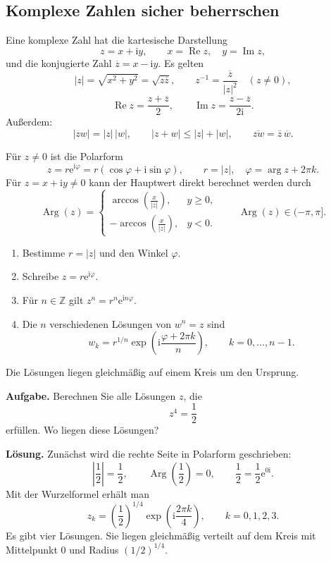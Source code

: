 \documentclass[11pt,a4paper]{article}
\newcommand{\Z}{\mathbb Z}
\newcommand{\ii}{\mathrm i}
\newcommand{\ee}{\mathrm e}
\newcommand{\Arg}{\operatorname{Arg}}
\newcommand{\Ree}{\operatorname{Re}}
\newcommand{\Imm}{\operatorname{Im}}
\newcommand{\1}{\mathbf 1}
\begin{document}
\subsection{Komplexe Zahlen sicher beherrschen}
Eine komplexe Zahl hat die kartesische Darstellung
\[
z=x+\ii y,\qquad x=\Ree z,\quad y=\Imm z,
\]
und die konjugierte Zahl $\overline z=x-\ii y$. Es gelten
\[
|z|=\sqrt{x^2+y^2}=\sqrt{z\overline z},\qquad
z^{-1}=\frac{\overline z}{|z|^2}\quad(z\neq0),
\]
\[
\Ree z=\frac{z+\overline z}{2},\qquad
\Imm z=\frac{z-\overline z}{2\ii}.
\]
Außerdem:
\[
|zw|=|z|\,|w|,\qquad |z+w|\le |z|+|w|,\qquad
\overline{zw}=\overline z\,\overline w.
\]

Für $z\neq0$ ist die Polarform
\[
z=r\ee^{\ii\varphi}=r(\cos\varphi+\ii\sin\varphi),
\qquad r=|z|,\quad \varphi=\arg z+2\pi k.
\]
Für $z=x+\ii y\neq0$ kann der Hauptwert direkt berechnet werden durch
\[
\Arg(z)=
\begin{cases}
\displaystyle \arccos\!\left(\frac{x}{|z|}\right),&y\geq0,\\[2mm]
\displaystyle-\arccos\!\left(\frac{x}{|z|}\right),&y<0.
\end{cases}
\qquad \Arg(z)\in(-\pi,\pi].
\]

\begin{kochrezeptbox}[title={Polarform, Potenzen und Wurzeln}]
\begin{enumerate}
\item Bestimme $r=|z|$ und den Winkel $\varphi$.
\item Schreibe $z=r\ee^{\ii\varphi}$.
\item Für $n\in\Z$ gilt $z^n=r^n\ee^{\ii n\varphi}$.
\item Die $n$ verschiedenen Lösungen von $w^n=z$ sind
\[
w_k=r^{1/n}\exp\!\left(\ii\frac{\varphi+2\pi k}{n}\right),
\qquad k=0,\ldots,n-1.
\]
\end{enumerate}
Die Lösungen liegen gleichmäßig auf einem Kreis um den Ursprung.
\end{kochrezeptbox}

\begin{beispielbox}[title=Vorgerechnetes Beispiel: vierte Wurzeln]
\textbf{Aufgabe.} Berechnen Sie alle Lösungen $z$, die
\[
z^4=\frac12
\]
erfüllen. Wo liegen diese Lösungen?

\textbf{Lösung.} Zunächst wird die rechte Seite in Polarform geschrieben:
\[
\left|\frac12\right|=\frac12,\qquad
\Arg\!\left(\frac12\right)=0,\qquad
\frac12=\frac12\ee^{0\ii}.
\]
Mit der Wurzelformel erhält man
\[
z_k=\left(\frac12\right)^{1/4}
\exp\!\left(\ii\frac{2\pi k}{4}\right),
\qquad k=0,1,2,3.
\]
Es gibt vier Lösungen. Sie liegen gleichmäßig verteilt auf dem Kreis mit
Mittelpunkt $0$ und Radius $(1/2)^{1/4}$.
\end{beispielbox}
\end{document}
